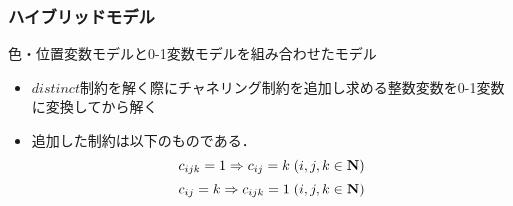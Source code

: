 \documentclass [dvipdfmx,12pt]{beamer}
\newcommand{\backupend}{
    \addtocounter{framenumberappendix}{-\value{framenumber}}
    \addtocounter{framenumber}{\value{framenumberappendix}}
}
\newcommand{\distinct}{$distinct$}
\begin{document}
\begin{frame}\small
    \frametitle{ハイブリッドモデル}
    色・位置変数モデルと0-1変数モデルを組み合わせたモデル\\
    \setlength{\abovedisplayskip}{1pt} %
    \setlength{\belowdisplayskip}{1pt} %
    \begin{block}{}
        \begin{itemize}
            \item \distinct 制約を解く際にチャネリング制約を追加し求める整数変数を0-1変数に変換してから解く
            \item 追加した制約は以下のものである．
                $$ c_{ijk}=1 \Rightarrow c_{ij}=k \; (i,j,k \in \bf N)$$
                $$ c_{ij}=k \Rightarrow c_{ijk}=1 \; (i,j,k \in \bf N)$$
        \end{itemize}
    \end{block}
\end{frame}










\backupend
\end{document}
